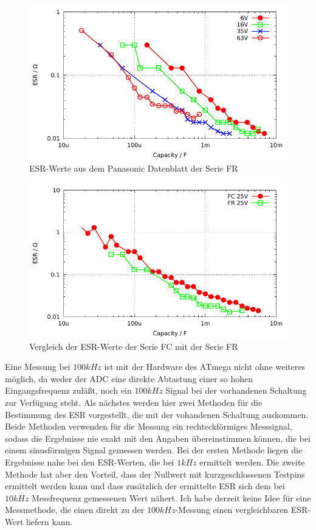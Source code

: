\begin{figure}[H]
  \centering
    \includegraphics[width=14cm]{../GNU/Cap_FR_data.pdf}
  \caption{ESR-Werte aus dem Panasonic Datenblatt der Serie FR}
  \label{fig:Cap_FR_data}
\end{figure}

\begin{figure}[H]
  \centering
    \includegraphics[width=14cm]{../GNU/Cap_FC_FR_data.pdf}
  \caption{Vergleich der ESR-Werte der Serie FC mit der Serie FR}
  \label{fig:Cap_FC_FR_data}
\end{figure}

Eine Messung bei \(100kHz\) ist mit der Hardware des ATmega nicht ohne weiteres möglich, da weder der ADC
eine direkte Abtastung einer so hohen Eingangsfrequenz zuläßt, noch ein \(100kHz\) Signal bei der vorhandenen Schaltung zur
Verfügung steht. 
Als nächstes werden hier zwei Methoden für die Bestimmung des ESR vorgestellt, die mit der vohandenen
Schaltung auskommen. 
Beide Methoden verwenden für die Messung ein rechteckförmiges Messsignal, sodass die Ergebnisse nie
exakt mit den Angaben übereinstimmen können, die bei einem sinusförmigen Signal gemessen werden.
Bei der ersten Methode liegen die Ergebnisse nahe bei den ESR-Werten, die bei \(1kHz\) ermittelt werden.
Die zweite Methode hat aber den Vorteil, dass der Nullwert mit kurzgeschlossenen Testpins ermittelt werden kann
und dass zusätzlich der ermittelte ESR sich dem bei \(10kHz\) Messfrequenz gemessenen Wert nähert.
Ich habe derzeit keine Idee für eine Messmethode, die einen direkt zu der \(100kHz\)-Messung einen 
vergleichbaren ESR-Wert liefern kann.

